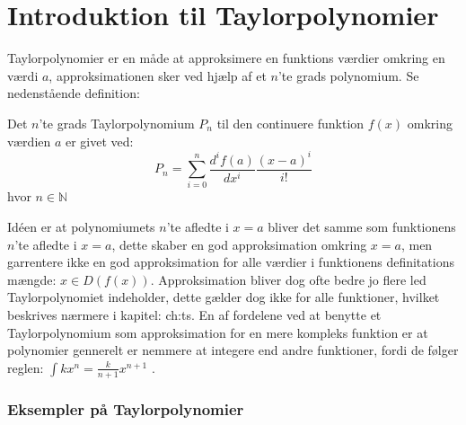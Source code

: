 \chapter{Introduktion til Taylorpolynomier}
\label{ch:tp}
Taylorpolynomier er en måde at approksimere en funktions værdier omkring en værdi $a$, 
approksimationen sker ved hjælp af et $n$'te grads polynomium. Se nedenstående definition: 
\begin{defn}
    Det $n$'te grads Taylorpolynomium $P_n$ til den continuere funktion $f(x)$ omkring værdien $a$ er givet ved:
    \[
    P_n = \sum^{n}_{i=0} \frac{d^i f(a)}{dx^i} \frac{(x-a)^{i}}{i!}
    \]
    hvor $n \in \mathbb{N}$
\end{defn}
\label{def:taylorPolynomium}
Idéen er at polynomiumets $n$'te afledte i $x = a$ bliver det samme som funktionens $n$'te afledte i $x = a$, 
dette skaber en god approksimation omkring $x = a$, men garrentere ikke en god approksimation 
for alle værdier i funktionens definitations mængde: $x \in D(f(x))$. Approksimation bliver dog ofte bedre jo 
flere led Taylorpolynomiet indeholder, dette gælder dog ikke for alle funktioner, hvilket beskrives nærmere i kapitel: \refname{ch:ts}. 
En af fordelene ved at benytte et Taylorpolynomium som approksimation for en mere kompleks funktion
er at polynomier gennerelt er nemmere at integere end andre funktioner, fordi de følger reglen: $\int k x^n = \frac{k}{n + 1}x^{n + 1}$ .


\subsection*{Eksempler på Taylorpolynomier}
